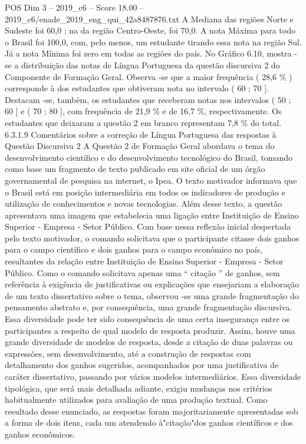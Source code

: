 \begin{textsample}{POS Dim 3 – 2019\_c6 – Score 18.00 – 2019\_c6/enade\_2019\_eng\_qui\_42a8487876.txt}
A Mediana das regiões Norte e Sudeste foi 60,0 ; na da região Centro-Oeste, foi 70,0.
A nota Máxima para todo o Brasil foi 100,0, com, pelo menos, um estudante tirando essa nota na região Sul.
Já a nota Mínima foi zero em todas as regiões do país.
No Gráfico 6.10, mostra -se a distribuição das notas de Língua Portuguesa da questão discursiva 2 do Componente de Formação Geral.
Observa -se que a maior frequência ( 28,6 \% ) corresponde à dos estudantes que obtiveram nota no intervalo ( 60 ; 70 ].
Destacam -se, também, os estudantes que receberam notas nos intervalos ( 50 ; 60 ] e ( 70 ; 80 ], com frequência de 21,9 \% e de 16,7 \%, respectivamente.
Os estudantes que deixaram a questão 2 em branco representam 7,8 \% do total. 6.3.1.9 Comentários sobre a correção de Língua Portuguesa das respostas à Questão Discursiva 2 A Questão 2 de Formação Geral abordava o tema do desenvolvimento científico e do desenvolvimento tecnológico do Brasil, tomando como base um fragmento de texto publicado em site oficial de um órgão governamental de pesquisa na internet, o Ipea.
O texto motivador informava que o Brasil está em posição intermediária em todos os indicadores de produção e utilização de conhecimentos e novas tecnologias.
Além desse texto, a questão apresentava uma imagem que estabelecia uma ligação entre Instituição de Ensino Superior - Empresa - Setor Público.
Com base nessa reflexão inicial despertada pelo texto motivador, o comando solicitava que o participante citasse dois ganhos para o campo científico e dois ganhos para o campo econômico no país, resultantes da relação entre Instituição de Ensino Superior - Empresa - Setor Público.
Como o comando solicitava apenas uma “ citação ” de ganhos, sem referência à exigência de justificativas ou explicações que ensejariam a elaboração de um texto dissertativo sobre o tema, observou -se uma grande fragmentação do pensamento abstrato e, por consequência, uma grande fragmentação discursiva.
Essa diversidade pode ter sido consequência de uma certa insegurança entre os participantes a respeito de qual modelo de resposta produzir.
Assim, houve uma grande diversidade de modelos de resposta, desde a citação de duas palavras ou expressões, sem desenvolvimento, até a construção de respostas com detalhamento dos ganhos sugeridos, acompanhados por uma justificativa de caráter dissertativo, passando por vários modelos intermediários.
Essa diversidade tipológica, que será mais detalhada adiante, exigiu mudanças nos critérios habitualmente utilizados para avaliação de uma produção textual.
Como resultado desse enunciado, as respostas foram majoritariamente apresentadas sob a forma de dois itens, cada um atendendo à"citação"dos ganhos científicos e dos ganhos econômicos.

\end{textsample}
